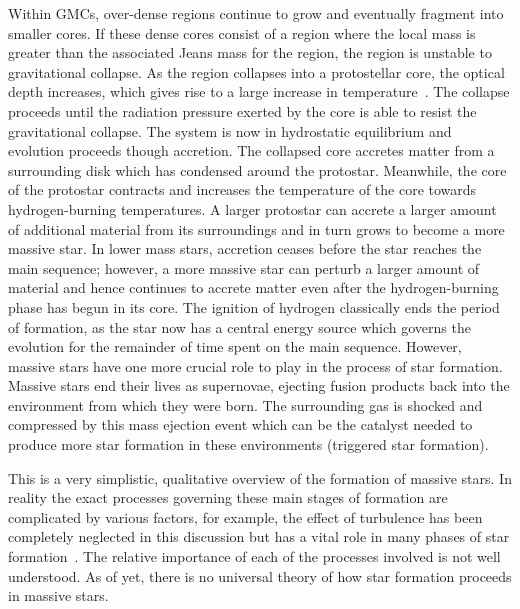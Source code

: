 Within GMCs, over-dense regions continue to grow and eventually fragment into smaller cores.
If these dense cores consist of a region where the local mass is greater than the associated Jeans mass for the region, the region is unstable to gravitational collapse.
As the region collapses into a protostellar core, the optical depth increases, which gives rise to a large increase in temperature~\citep{Zinnecker07}.
The collapse proceeds until the radiation pressure exerted by the core is able to resist the gravitational collapse.
The system is now in hydrostatic equilibrium and evolution proceeds though accretion.
The collapsed core accretes matter from a surrounding disk which has condensed around the protostar.
Meanwhile, the core of the protostar contracts and increases the temperature of the core towards hydrogen-burning temperatures.
A larger protostar can accrete a larger amount of additional material from its surroundings and in turn grows to become a more massive star.
In lower mass stars, accretion ceases before the star reaches the main sequence; however, a more massive star can perturb a larger amount of material and hence continues to accrete matter even after the hydrogen-burning phase has begun in its core.
The ignition of hydrogen classically ends the period of formation, as the star now has a central energy source which governs the evolution for the remainder of time spent on the main sequence.
However, massive stars have one more crucial role to play in the process of star formation.
Massive stars end their lives as supernovae, ejecting fusion products back into the environment from which they were born.
The surrounding gas is shocked and compressed by this mass ejection event which can be the catalyst needed to produce more star formation in these environments (triggered star formation).

This is a very simplistic, qualitative overview of the formation of massive stars.
In reality the exact processes governing these main stages of formation are complicated by various factors, for example, the effect of turbulence has been completely neglected in this discussion but has a vital role in many phases of star formation~\citep{McKee07}.
The relative importance of each of the processes involved is not well understood.
As of yet, there is no universal theory of how star formation proceeds in massive stars.

